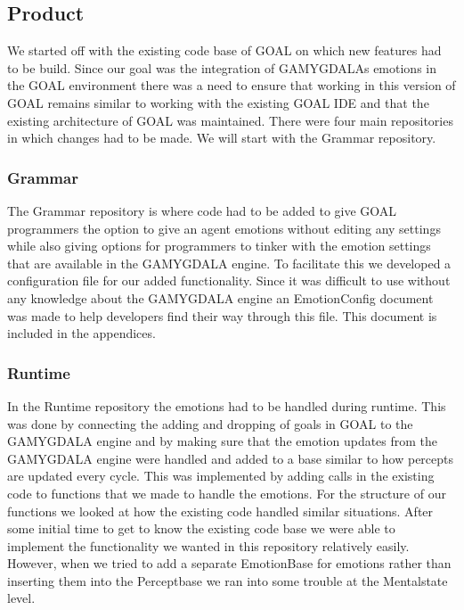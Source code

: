 \documentclass[11pt]{article}
\begin{document}
\subsection{Product}
We started off with the existing code base of \gls{GOAL}\cite{GOAL} on which new features had to be build. Since our goal was the integration of \gls{GAMYGDALA}s\cite{GAMYGDALA} emotions in the GOAL environment\cite{GOAL Env} there was a need to ensure that working in this version of GOAL remains similar to working with the existing GOAL IDE \cite{SimpleIDE}and that the existing architecture of GOAL was maintained. There were four main repositories in which changes had to be made. We will start with the Grammar repository.
\subsubsection{Grammar}
The Grammar repository is where code had to be added to give GOAL programmers the option to give an agent emotions without editing any settings while also giving options for programmers to tinker with the emotion settings that are available in the GAMYGDALA engine. To facilitate this we developed a configuration file for our added functionality. Since it was difficult to use without any knowledge about the GAMYGDALA engine an EmotionConfig\cite{emotionconfig} document was made to help developers find their way through this file. This document is included in the appendices.
\subsubsection{Runtime} 
In the Runtime repository the emotions had to be handled during runtime. This was done by connecting the adding and dropping of goals in GOAL to the GAMYGDALA engine and by making sure that the emotion updates from the GAMYGDALA engine were handled and added to a base similar to how percepts are updated every cycle. This was implemented by adding calls in the existing code to functions that we made to handle the emotions. For the structure of our functions we looked at how the existing code handled similar situations. After some initial time to get to know the existing code base we were able to implement the functionality we wanted in this repository relatively easily. However, when we tried to add a separate EmotionBase for emotions rather than inserting them into the Perceptbase we ran into some trouble at the Mentalstate level. \par 
\end{document}

